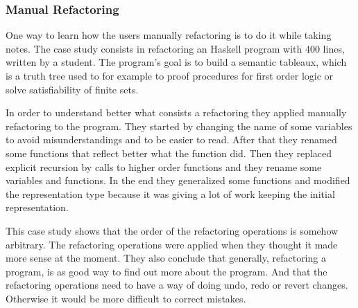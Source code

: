 


\subsubsection{Manual Refactoring}
\label{ssub:Manual-Refactoring}
One way to learn how the users manually refactoring is to do it while taking notes.
The case study\cite{thompson2003case} consists in refactoring an Haskell program with 400 lines, written by a student.
The program's goal is to build a semantic tableaux, which is a truth tree used to  for example to proof procedures for first order logic or solve satisfiability of finite sets.

In order to understand better what consists a refactoring they applied manually refactoring to the program.
They started by changing the name of some variables to avoid misunderstandings and to be easier to read.
After that they renamed some functions that reflect better what the function did. 
Then they replaced explicit recursion by calls to higher order functions and they rename some variables and functions.
In the end they generalized some functions and modified the representation type because it was giving a lot of work keeping the initial representation.

This case study shows that the order of the refactoring operations is somehow arbitrary.
The refactoring operations were applied when they thought it made more sense at the moment.
They also conclude that generally, refactoring a program, is as good way to find out more about the program. 
And that the refactoring operations need to have a way of doing undo, redo or revert changes. 
Otherwise it would be more difficult to correct mistakes.

